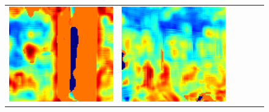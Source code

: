 \documentclass[twoside]{ctuthesis}
\theoremstyle{plain}
\theoremstyle{definition}
\theoremstyle{note}
\begin{document}
{\begin{figure}
{\begin{tabular}{c|c|c|c|c|c}
    \includegraphics[width=\thiswidth]{evaluation/queryPipeline/3.jpg/errmap} & 
    \includegraphics[width=\thiswidth]{evaluation/queryPipeline/6.jpg/errmap} & 

\end{tabular}}
\end{figure}}
\end{document}
